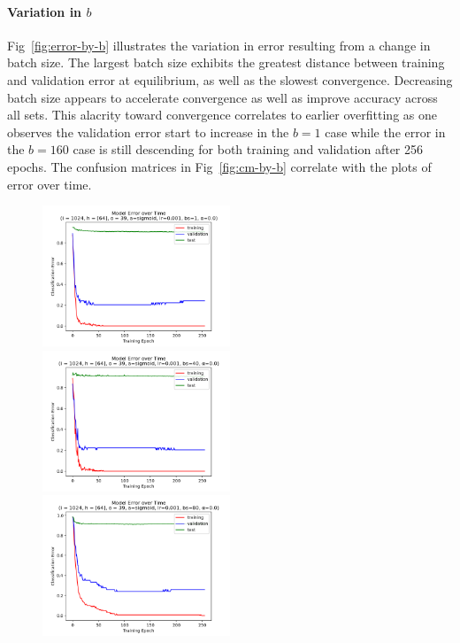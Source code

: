 \documentclass[10pt,epsf]{article}
\begin{document}
{{    \paragraph{Variation in $b$}{
      Fig~\ref{fig:error-by-b} illustrates the variation in error resulting from a change in batch size.
      The largest batch size exhibits the greatest distance between training and validation error
      at equilibrium, as well as the slowest convergence. Decreasing batch size appears to accelerate
      convergence as well as improve accuracy across all sets. This alacrity toward convergence
      correlates to earlier overfitting as one observes the validation error start to increase in the
      $b = 1$ case while the error in the $b = 160$ case is still descending for both training and
      validation after 256 epochs. The confusion matrices in Fig~\ref{fig:cm-by-b} correlate with
      the plots of error over time.
    }
    \begin{figure}[H]
      \includegraphics[width=0.5\textwidth]{./img/64-0.001-1-0-sigmoid-1/error-255.png}
      \includegraphics[width=0.5\textwidth]{./img/64-0.001-40-0-sigmoid-1/error-255.png}
      \includegraphics[width=0.5\textwidth]{./img/64-0.001-80-0-sigmoid-1/error-255.png}

\end{figure}}}
\end{document}

